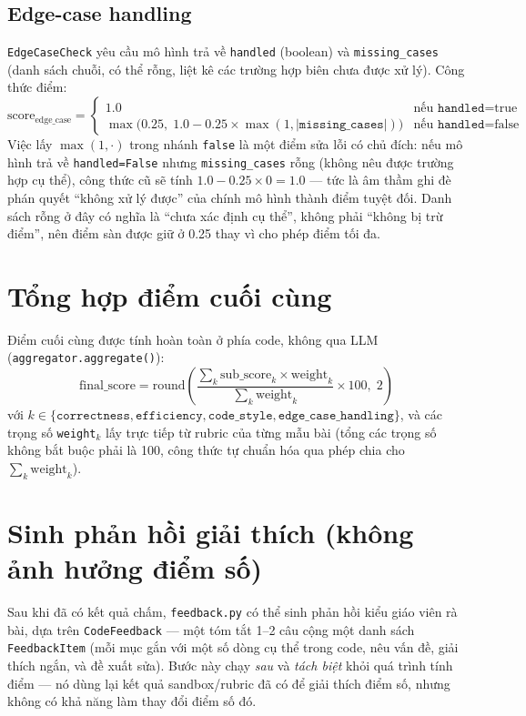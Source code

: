 \documentclass[a4paper,12pt]{report}
\begin{document}
\subsection{Edge-case handling}

\texttt{EdgeCaseCheck} yêu cầu mô hình trả về \texttt{handled} (boolean) và
\texttt{missing\_cases} (danh sách chuỗi, có thể rỗng, liệt kê các trường
hợp biên chưa được xử lý). Công thức điểm:
\[
\text{score}_{\text{edge\_case}} =
\begin{cases}
1.0 & \text{nếu } \texttt{handled} = \text{true} \\
\max\bigl(0.25,\; 1.0 - 0.25 \times \max(1, |\texttt{missing\_cases}|)\bigr)
  & \text{nếu } \texttt{handled} = \text{false}
\end{cases}
\]
Việc lấy $\max(1, \cdot)$ trong nhánh \texttt{false} là một điểm sửa lỗi có
chủ đích: nếu mô hình trả về \texttt{handled=False} nhưng
\texttt{missing\_cases} rỗng (không nêu được trường hợp cụ thể), công thức
cũ sẽ tính $1.0 - 0.25 \times 0 = 1.0$ — tức là âm thầm ghi đè phán quyết
``không xử lý được'' của chính mô hình thành điểm tuyệt đối. Danh sách rỗng
ở đây có nghĩa là ``chưa xác định cụ thể'', không phải ``không bị trừ
điểm'', nên điểm sàn được giữ ở 0.25 thay vì cho phép điểm tối đa.

\section{Tổng hợp điểm cuối cùng}
\label{sec:aggregation}

Điểm cuối cùng được tính hoàn toàn ở phía code, không qua LLM
(\texttt{aggregator.aggregate()}):
\[
\text{final\_score} = \text{round}\!\left(
  \frac{\sum_{k} \text{sub\_score}_k \times \text{weight}_k}
       {\sum_{k} \text{weight}_k} \times 100,\; 2 \right)
\]
với $k \in \{\texttt{correctness}, \texttt{efficiency},
\texttt{code\_style}, \texttt{edge\_case\_handling}\}$, và các trọng số
\texttt{weight}$_k$ lấy trực tiếp từ rubric của từng mẫu bài (tổng các
trọng số không bắt buộc phải là 100, công thức tự chuẩn hóa qua phép chia
cho $\sum_k \text{weight}_k$).

\section{Sinh phản hồi giải thích (không ảnh hưởng điểm số)}
\label{sec:feedback}

Sau khi đã có kết quả chấm, \texttt{feedback.py} có thể sinh phản hồi kiểu
giáo viên rà bài, dựa trên \texttt{CodeFeedback} — một tóm tắt 1--2 câu
cộng một danh sách \texttt{FeedbackItem} (mỗi mục gắn với một số dòng cụ
thể trong code, nêu vấn đề, giải thích ngắn, và đề xuất sửa). Bước này chạy
\emph{sau} và \emph{tách biệt} khỏi quá trình tính điểm — nó dùng lại kết
quả sandbox/rubric đã có để giải thích điểm số, nhưng không có khả năng làm
thay đổi điểm số đó.
\end{document}
